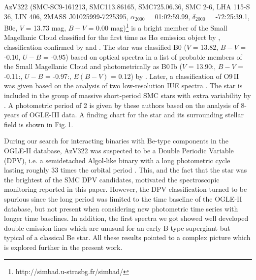 \documentclass[useAMS,usenatbib]{mn2e}
\begin{document}
 
AzV322 (SMC-SC9-161213, SMC113.86165, SMC725.06.36, SMC 2-6, LHA 115-S 36, LIN 406,  2MASS J01025999-7225395, $\alpha_{2000}$ = 01:02:59.99, $\delta_{2000}$ =  -72:25:39.1, B0e, $V$ = 13.73 mag, $B-V$ =  0.00 mag)\footnote{http://simbad.u-strasbg.fr/simbad/}
is a bright member of the Small Magellanic Cloud 
classified for the first time as H$\alpha$ emission object 
by \citet{1956ApJS....2..315H}, classification confirmed
by \citet{1975A&AS...22..285A} and \citet{1993A&AS..102..451M}. The star was
classified B0 ($V$ = 13.82, $B-V$ = -0.10, $U-B$ = -0.95) based on optical spectra in a list of probable members of the Small Magellanic Cloud \citep{1975A&AS...22..285A}
and photometrically as B0\,Ib  ($V$ = 13.90:, $B-V$ = -0.11:, $U-B$ = -0.97:, $E(B-V)$ = 0.12) by \citet{1970A&A.....9...95D}. Later, a classification of 
O9\,II was given based on the analysis of two low-resolution IUE spectra \citep{1997AJ....114.1951S}. The star is included in the group of massive short-period SMC stars with extra variability by  \citet{2014A&A...562A.125K}. A photometric period of 2  is given by these authors based on the analysis of 8-years of OGLE-III data. A finding chart for the star and its surrounding stellar field is shown in Fig.\,1. 



During our search for interacting binaries with Be-type components in the OGLE-II database, 
AzV322 was suspected to be a Double Periodic Variable (DPV), i.e. a semidetached 
Algol-like binary with a long photometric cycle lasting roughly 33 times the orbital period  \citep[eg.][]{2003A&A...399L..47M, 2016MNRAS.455.1728M,2017SerAJ.194....1M}.
This, and the fact that the star was the brightest of the SMC  DPV candidates, motivated the spectroscopic monitoring reported in this paper. However, the DPV classification
turned to be spurious since the long period was limited to the time baseline of the OGLE-II database, but not present when considering new photometric time series with longer time baselines. In addition, the first spectra we got showed well developed double emission lines which are unusual for an early B-type supergiant but typical of a classical Be star. All these results pointed to a complex picture  which is explored further in the present work. 
\end{document}
